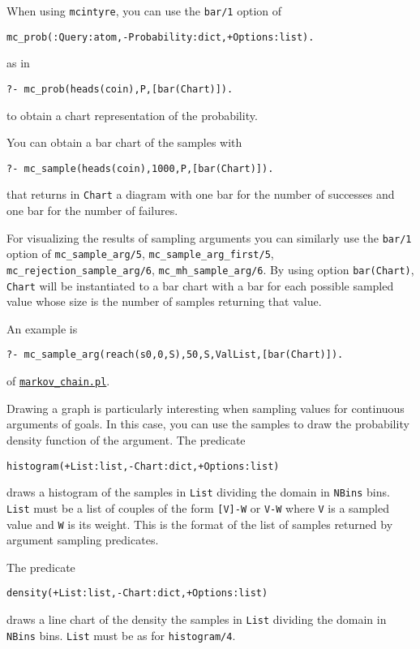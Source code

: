 When using \verb|mcintyre|, you can use the \verb|bar/1| option of
\begin{verbatim}
mc_prob(:Query:atom,-Probability:dict,+Options:list).
\end{verbatim}
as in
\begin{verbatim}
?- mc_prob(heads(coin),P,[bar(Chart)]).
\end{verbatim}
to obtain a chart representation of the probability.

You can obtain a bar chart of the samples with
\begin{verbatim}
?- mc_sample(heads(coin),1000,P,[bar(Chart)]).
\end{verbatim}
that returns in \verb|Chart| a diagram with one bar for the number of successes and
one bar for the number of failures.

For visualizing the results of sampling arguments you can similarly use the  \verb|bar/1| option of
\verb|mc_sample_arg/5|, \verb|mc_sample_arg_first/5|,  \verb|mc_rejection_sample_arg/6|, 
 \verb|mc_mh_sample_arg/6|.
By using option \verb|bar(Chart)|, \verb|Chart| will be instantiated to a bar chart with a bar for each possible sampled value whose size is the number of samples
returning that value.

An example is
\begin{verbatim}
?- mc_sample_arg(reach(s0,0,S),50,S,ValList,[bar(Chart)]).
\end{verbatim}
of \href{http://cplint.eu/example/inference/markov_chain.pl}{\texttt{markov\_chain.pl}}.

Drawing a graph is particularly interesting when
sampling values for continuous arguments of goals.
In this case, you can use the samples to draw the
probability density function of the argument.
The predicate
\begin{verbatim}
histogram(+List:list,-Chart:dict,+Options:list)
\end{verbatim}
draws a histogram of the samples in \verb|List| dividing the domain in
 \verb|NBins| bins.
\verb|List| must be a list of couples of the form \verb|[V]-W| or  \verb|V-W|
where \verb|V| is a sampled value and \verb|W| is its weight. This is the format of the list of samples returned by argument sampling predicates.

The predicate
\begin{verbatim}
density(+List:list,-Chart:dict,+Options:list)
\end{verbatim}
draws a line chart of the density the samples in \verb|List| dividing the domain in
 \verb|NBins| bins.
\verb|List| must be as for \verb|histogram/4|.

